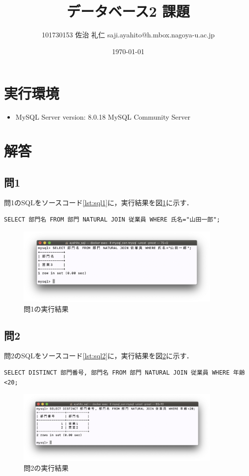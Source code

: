 \documentclass[uplatex]{jsarticle}
\title{データベース2 課題}
\author{101730153 佐治 礼仁 saji.ayahito@h.mbox.nagoya-u.ac.jp}
\date{\today}
\begin{document}
\maketitle
\section{実行環境}
\begin{itemize}
  \item MySQL Server version: 8.0.18 MySQL Community Server
\end{itemize}
\section{解答}
\subsection{問1}
問1のSQLをソースコード\ref{lst:sql1}に，実行結果を図\ref{fig:ans1}に示す．
\begin{lstlisting}[caption=問1のSQL,label=lst:sql1]
SELECT 部門名 FROM 部門 NATURAL JOIN 従業員 WHERE 氏名="山田一郎";
\end{lstlisting}
\begin{figure}[htb]
\begin{center}
\includegraphics[width=100mm]{figures/ans1.png}
\caption{問1の実行結果}
\label{fig:ans1}
\end{center}
\end{figure}

\subsection{問2}
問2のSQLをソースコード\ref{lst:sql2}に，実行結果を図\ref{fig:ans2}に示す．
\begin{lstlisting}[caption=問2のSQL,label=lst:sql2]
SELECT DISTINCT 部門番号, 部門名 FROM 部門 NATURAL JOIN 従業員 WHERE 年齢<20;
\end{lstlisting}
\begin{figure}[htb]
\begin{center}
\includegraphics[width=100mm]{figures/ans2.png}
\caption{問2の実行結果}
\label{fig:ans2}
\end{center}
\end{figure}
\end{document}
